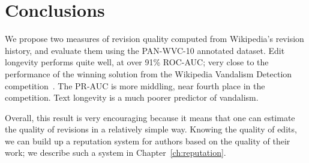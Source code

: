 \section{Conclusions}

We propose two measures of revision quality computed
from Wikipedia's revision history, and evaluate them
using the PAN-WVC-10 annotated dataset.
Edit longevity performs quite well, at over 91\% ROC-AUC;
very close to the performance of the winning solution from
the Wikipedia Vandalism Detection competition~\cite{Potthast2010b}.
The PR-AUC is more middling, near fourth place in the competition.
Text longevity is a much poorer predictor of vandalism.

Overall, this result is very encouraging because it means that one can
estimate the quality of revisions in a relatively simple way.
Knowing the quality of edits, we can build up a reputation
system for authors based on the quality of their work;
we describe such a system in Chapter~\ref{ch:reputation}.




